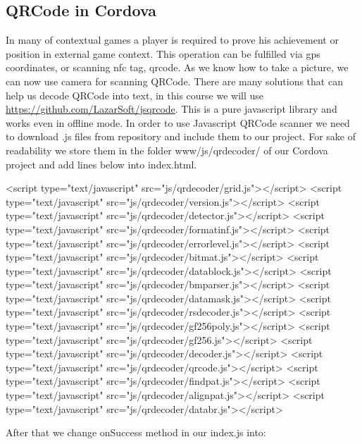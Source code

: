  \subsection{QRCode in Cordova}

 In many of contextual games a player is required to prove his achievement or position in external game context. This operation can be fulfilled via gps coordinates, or scanning nfc tag, qrcode. As we know how to take a picture, we can now use camera for scanning QRCode. There are many solutions that can help us decode QRCode into text, in this course we will use \url{https://github.com/LazarSoft/jsqrcode}. This is a pure javascript library and works even in offline mode. In order to use Javascript QRCode scanner  we need to download .js files from repository  and include them to our project. For sake of readability we store them in the folder www/js/qrdecoder/ of our Cordova project and add lines below into index.html.

\begin{html}
<script type="text/javascript" src="js/qrdecoder/grid.js"></script>
<script type="text/javascript" src="js/qrdecoder/version.js"></script>
<script type="text/javascript" src="js/qrdecoder/detector.js"></script>
<script type="text/javascript" src="js/qrdecoder/formatinf.js"></script>
<script type="text/javascript" src="js/qrdecoder/errorlevel.js"></script>
<script type="text/javascript" src="js/qrdecoder/bitmat.js"></script>
<script type="text/javascript" src="js/qrdecoder/datablock.js"></script>
<script type="text/javascript" src="js/qrdecoder/bmparser.js"></script>
<script type="text/javascript" src="js/qrdecoder/datamask.js"></script>
<script type="text/javascript" src="js/qrdecoder/rsdecoder.js"></script>
<script type="text/javascript" src="js/qrdecoder/gf256poly.js"></script>
<script type="text/javascript" src="js/qrdecoder/gf256.js"></script>
<script type="text/javascript" src="js/qrdecoder/decoder.js"></script>
<script type="text/javascript" src="js/qrdecoder/qrcode.js"></script>
<script type="text/javascript" src="js/qrdecoder/findpat.js"></script>
<script type="text/javascript" src="js/qrdecoder/alignpat.js"></script>
<script type="text/javascript" src="js/qrdecoder/databr.js"></script>
\end{html}

After that we change onSuccess method in our index.js into:

